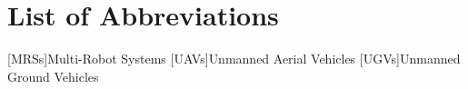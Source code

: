 \cleardoublepage
{}
\tableofcontents
\clearpage

\cleardoublepage
{}
{}
\chapter*{List of Abbreviations}
\begin{acronym}[\hspace{3cm}]
  [MRSs]{Multi-Robot Systems}
  [UAVs]{Unmanned Aerial Vehicles}
  [UGVs]{Unmanned Ground Vehicles}
\end{acronym}
\clearpage

\cleardoublepage
{}
{}
\listoffigures
\clearpage

\cleardoublepage
{}
{}
\listoftables
\clearpage
